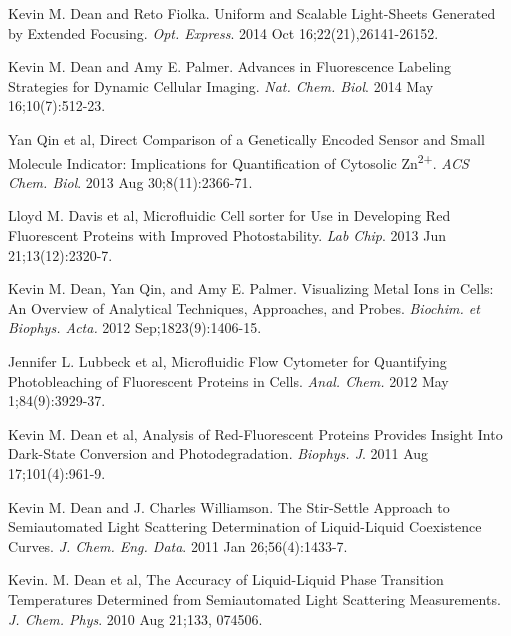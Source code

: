 \documentclass[10pt]{res}
\begin{document}
\begin{resume}
\begin{etaremune}
\item Kevin M. Dean and Reto Fiolka.  Uniform and Scalable Light-Sheets Generated by Extended Focusing.  {\it Opt. Express}.  2014  Oct 16;22(21),26141-26152.

\item Kevin M. Dean and Amy E. Palmer.  Advances in Fluorescence Labeling Strategies for Dynamic Cellular Imaging.   {\it Nat. Chem. Biol}. 2014 May 16;10(7):512-23. 

\item Yan Qin et al, Direct Comparison of a Genetically Encoded Sensor and Small Molecule Indicator: Implications for Quantification of Cytosolic Zn\textsuperscript{2+}. {\it ACS Chem. Biol}. 2013 Aug 30;8(11):2366-71.

\item Lloyd M. Davis et al, Microfluidic Cell sorter for Use in Developing Red Fluorescent Proteins with Improved Photostability. {\it Lab Chip}. 2013 Jun 21;13(12):2320-7.

\item Kevin M. Dean, Yan Qin, and Amy E. Palmer.  Visualizing Metal Ions in Cells:  An Overview of Analytical Techniques, Approaches, and Probes. {\it Biochim. et Biophys. Acta.}  2012  Sep;1823(9):1406-15.

\item Jennifer L. Lubbeck et al, Microfluidic Flow Cytometer for Quantifying Photobleaching of Fluorescent Proteins in Cells. {\it Anal. Chem.} 2012 May 1;84(9):3929-37.

\item Kevin M. Dean et al, Analysis of Red-Fluorescent Proteins Provides Insight Into Dark-State Conversion and Photodegradation.  {\it Biophys. J}. 2011 Aug 17;101(4):961-9.

\item Kevin M. Dean and J. Charles Williamson. The Stir-Settle Approach to Semiautomated Light Scattering Determination of Liquid-Liquid Coexistence Curves.  {\it J. Chem. Eng. Data}.  2011 Jan 26;56(4):1433-7. 

\item Kevin. M. Dean et al, The Accuracy of Liquid-Liquid Phase Transition Temperatures Determined from Semiautomated Light Scattering Measurements.  {\it J. Chem. Phys}. 2010 Aug 21;133, 074506.

\end{etaremune}


\end{resume}
\end{document}
